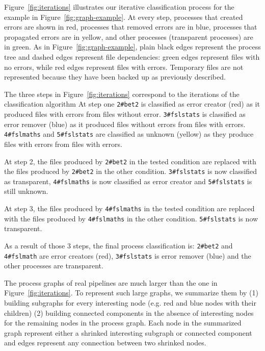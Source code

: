 \documentclass{article}
\begin{document}
Figure~\ref{fig:iterations} illustrates our iterative classification 
process for the example in Figure~\ref{fig:graph-example}. At every 
step, processes that created errors are shown in red, processes that 
removed errors are in blue, processes that propagated errors are in 
yellow, and other processes (transparent processes) are in green. As in 
Figure~\ref{fig:graph-example}, plain black edges represent the process 
tree and dashed edges represent file dependencies: green edges 
represent files with no errors, while red edges represent files with 
errors. Temporary files are not represented because they have been 
backed up as previously described.

The three steps in Figure~\ref{fig:iterations} correspond to the 
iterations of the classification algorithm At step one \texttt{2\#bet2} 
is classified as error creator (red) as it produced files with errors 
from files without error. \texttt{3\#fslstats} is classified as error 
remover (blue) as it produced files without errors from files with 
errors. \texttt{4\#fslmaths} and \texttt{5\#fslstats} are classified as 
unknown (yellow) as they produce files with errors from files with errors.

At step 2, the files produced by \texttt{2\#bet2} in the tested 
condition are replaced with the files produced by \texttt{2\#bet2} in 
the other condition. \texttt{3\#fslstats} is now classified as transparent, \texttt{4\#fslmaths} is now classified
as error creator and \texttt{5\#fslstats} is still unknown.

 At step 3, the files produced by \texttt{4\#fslmaths} in the tested 
 condition are replaced with the files produced by \texttt{4\#fslmaths} 
 in the other condition. \texttt{5\#fslstats} is now transparent.
 
 As a result of those 3 steps, the final process classification is: 
 \texttt{2\#bet2} and \texttt{4\#fslmath} are error creators (red), 
 \texttt{3\#fslstats} is error remover (blue) and the other processes 
 are transparent.

The process graphs of real pipelines are much larger than the one in 
Figure~\ref{fig:iterations}. To represent such large graphs, we 
summarize them by (1) building subgraphs for every interesting node 
(e.g. red and blue nodes with their children) (2) building connected components 
in the absence of interesting nodes for the remaining nodes in the process graph. 
Each node in the summarized graph represent either a shrinked interesting subgraph or 
connected component and edges represent any connection between two shrinked nodes.
\end{document}

